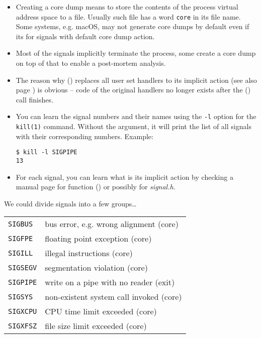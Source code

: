 \begin{itemize}
\item Creating a core dump means to store the contents of the process virtual
address space to a file.  Usually such file has a word \texttt{core} in its
file name. Some systems, e.g. macOS, may not generate core dumps by default even
if its for signals with default core dump action.
\item Most of the signals implicitly terminate the process, some create a core
dump on top of that to enable a post-mortem analysis.
\item The reason why () replaces all user set handlers to its
implicit action (see also page \pageref{EXEC}) is obvious -- code of the
original handlers no longer exists after the () call finishes.
\item You can learn the signal numbers and their names using the \texttt{-l}
option for the \texttt{kill(1)} command.  Without the argument, it will print
the list of all signals with their corresponding numbers.  Example:

\begin{verbatim}
$ kill -l SIGPIPE
13
\end{verbatim}
\item For each signal, you can learn what is its implicit action by checking a
manual page for function () or possibly for \emph{signal.h}.
\end{itemize}



\begin{slide}

We could divide signals into a few groups\dots


\begin{tabular}{ll}
\texttt{SIGBUS} & bus error, e.g. wrong alignment (core) \\
\texttt{SIGFPE} & floating point exception (core) \\
\texttt{SIGILL} & illegal instructions (core) \\
\texttt{SIGSEGV} & segmentation violation (core) \\
\texttt{SIGPIPE} & write on a pipe with no reader (exit) \\
\texttt{SIGSYS} & non-existent system call invoked (core) \\
\texttt{SIGXCPU} & CPU time limit exceeded (core) \\
\texttt{SIGXFSZ} & file size limit exceeded (core)\\
\end{tabular}
\end{slide}

